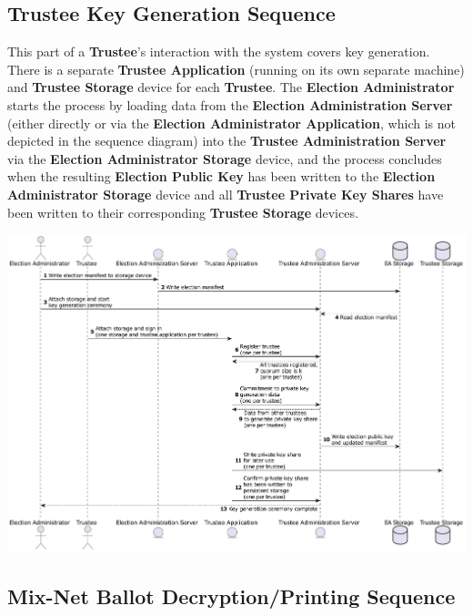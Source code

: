 \documentclass[10pt,letterpaper]{article}
\begin{document}
\pagebreak
\subsection{Trustee Key Generation Sequence}

This part of a \textbf{Trustee}'s interaction with the system covers key generation. There is a separate \textbf{Trustee Application} (running on its own separate machine) and \textbf{Trustee Storage} device for each \textbf{Trustee}. The \textbf{Election Administrator} starts the process by loading data from the \textbf{Election Administration Server} (either directly or via the \textbf{Election Administrator Application}, which is not depicted in the sequence diagram) into the \textbf{Trustee Administration Server} via the \textbf{Election Administrator Storage} device, and the process concludes when the resulting \textbf{Election Public Key} has been written to the \textbf{Election Administrator Storage} device and all \textbf{Trustee Private Key Shares} have been written to their corresponding \textbf{Trustee Storage} devices.

\includegraphics[width=\textwidth]{diagrams/seq-trustee-keygen.pdf}

\pagebreak
\subsection{Mix-Net Ballot Decryption/Printing Sequence}
\end{document}
